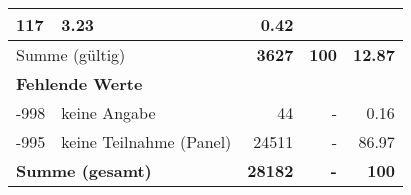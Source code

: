 \begin{longtable}{lXrrr}
       \num{117} &
       \num[round-mode=places,round-precision=2]{3.23} &
         \num[round-mode=places,round-precision=2]{0.42} \\
     \midrule
     \multicolumn{2}{l}{Summe (gültig)} &
       \textbf{\num{3627}} &
     \textbf{100} &
       \textbf{\num[round-mode=places,round-precision=2]{12.87}} \\
     \multicolumn{5}{l}{\textbf{Fehlende Werte}}\\
       -998 &
       keine Angabe &
         \num{44} &
        - &
         \num[round-mode=places,round-precision=2]{0.16} \\
       -995 &
       keine Teilnahme (Panel) &
         \num{24511} &
        - &
         \num[round-mode=places,round-precision=2]{86.97} \\
     \midrule
     \multicolumn{2}{l}{\textbf{Summe (gesamt)}} &
          \textbf{\num{28182}} &
        \textbf{-} &
        \textbf{100} \\
     \bottomrule
     \end{longtable}
     
